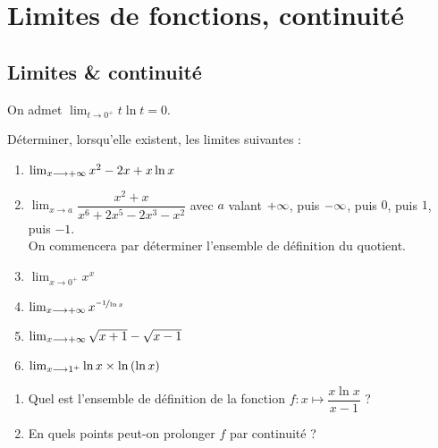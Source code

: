 \chapter{Limites de fonctions, continuité}

\minitoc

\section{Limites \& continuité}

\begin{exo}
On admet \(\lim_{t\to0^+}t\ln t=0\).

Déterminer, lorsqu'elle existent, les limites suivantes :

\begin{enumerate}
\item \(\lim_{x\longrightarrow+\infty}x^2-2x+x\ln x\) \\

\item \(\lim_{x\to a}\dfrac{x^2+x}{x^6+2x^5-2x^3-x^2}\) avec \(a\) valant \(+\infty\), puis \(-\infty\), puis \(0\), puis \(1\), puis \(-1\). \\

On commencera par déterminer l'ensemble de définition du quotient. \\

\item \(\lim_{x\to0^+}x^x\) \\

\item \(\lim_{x\longrightarrow+\infty}x^{\nicefrac{-1}{\ln x}}\) \\

\item \(\lim_{x\longrightarrow+\infty}\sqrt{x+1}-\sqrt{x-1}\) \\

\item \(\lim_{x\longrightarrow1^+}\ln x\times\ln\left(\ln x\right)\)
\end{enumerate}
\end{exo}

\begin{corr}
\end{corr}

\begin{exo}
\begin{enumerate}
\item Quel est l'ensemble de définition de la fonction \(f:x\mapsto\dfrac{x\ln x}{x-1}\) ? \\

\item En quels points peut-on prolonger \(f\) par continuité ?
\end{enumerate}
\end{exo}

